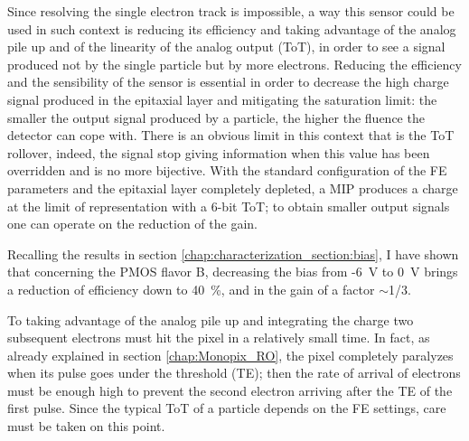    Since resolving the single electron track is impossible, a way this sensor could be used in such context is reducing its efficiency and taking advantage of the analog pile up and of the linearity of the analog output (ToT), in order to see a signal produced not by the single particle but by more electrons. 
   Reducing the efficiency and the sensibility of the sensor is essential in order to decrease the high charge signal produced in the epitaxial layer and mitigating the saturation limit: the smaller the output signal produced by a particle, the higher the fluence the detector can cope with.
   There is an obvious limit in this context that is the ToT rollover, indeed, the signal stop giving information when this value has been overridden and is no more bijective.
   With the standard configuration of the FE parameters and the epitaxial layer completely depleted, a MIP produces a charge at the limit of representation with a 6-bit ToT; to obtain smaller output signals one can operate on the reduction of the gain.

   Recalling the results in section \ref{chap:characterization_section:bias}, I have shown that concerning the PMOS flavor B, decreasing the bias from -\SI{6}{V} to \SI{0}{V} brings a reduction of efficiency down to \SI{40}{\%}, and in the gain of a factor $\sim$1/3.
   
   To taking advantage of the analog pile up and integrating the charge two subsequent electrons must hit the pixel in a relatively small time. In fact, as already explained in section \ref{chap:Monopix_RO}, the pixel completely paralyzes when its pulse goes under the threshold (TE); then the rate of arrival of electrons must be enough high to prevent the second electron arriving after the TE of the first pulse. Since the typical ToT of a particle depends on the FE settings, care must be taken on this point. 
   
